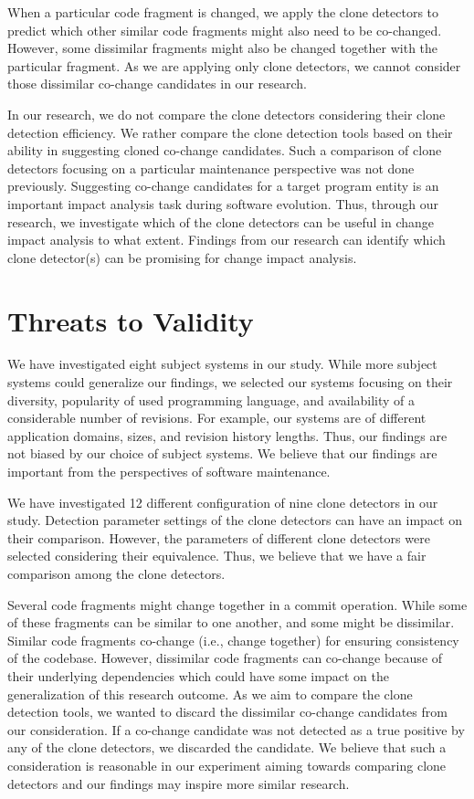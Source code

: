 \documentclass[review]{elsarticle}
\begin{document}
\vspace{1mm}
When a particular code fragment is changed, we apply the clone detectors to predict which other similar code fragments might also need to be co-changed. However, some dissimilar fragments might also be changed together with the particular fragment. As we are applying only clone detectors, we cannot consider those dissimilar co-change candidates in our research.

\vspace{1mm}
In our research, we do not compare the clone detectors considering their clone detection efficiency. We rather compare the clone detection tools based on their ability in suggesting cloned co-change candidates. Such a comparison of clone detectors focusing on a particular maintenance perspective was not done previously. Suggesting co-change candidates for a target program entity is an important impact analysis \citep{book-change-impact} task during software evolution. Thus, through our research, we investigate which of the clone detectors can be useful in change impact analysis to what extent. Findings from our research can identify which clone detector(s) can be promising for change impact analysis. 

\vspace{2mm}
\section{Threats to Validity}
\label{the-threat-validity}
We have investigated eight subject systems in our study. While more subject systems could generalize our findings, we selected our systems focusing on their diversity, popularity of used programming language, and availability of a considerable number of revisions. For example, our systems are of different application domains, sizes, and revision history lengths. Thus, our findings are not biased by our choice of subject systems. We believe that our findings are important from the perspectives of software maintenance.

We have investigated 12 different configuration of nine clone detectors in our study. 
Detection parameter settings of the clone detectors can have an impact on their comparison. However, the parameters of different clone detectors were selected considering their equivalence. Thus, we believe that we have a fair comparison among the clone detectors.

Several code fragments might change together in a commit operation. While some of these fragments can be similar to one another, and some might be dissimilar. Similar code fragments co-change (i.e., change together) for ensuring consistency of the codebase. However, dissimilar code fragments can co-change because of their underlying dependencies which could have some impact on the generalization of this research outcome. As we aim to compare the clone detection tools, we wanted to discard the dissimilar co-change candidates from our consideration. If a co-change candidate was not detected as a true positive by any of the clone detectors, we discarded the candidate. We believe that such a consideration is reasonable in our experiment aiming towards comparing clone detectors and our findings may inspire more similar research.
\end{document}
